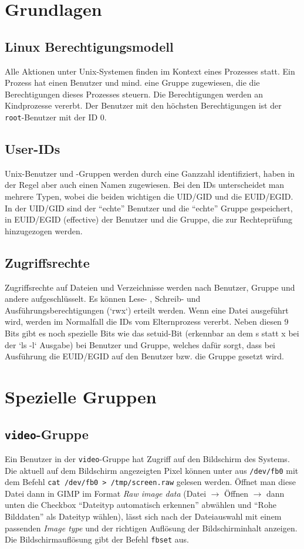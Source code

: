 \documentclass[
    parskip=half,
    landscape
]{scrartcl}
\begin{document}
\begin{multicols}{3}
\section{Grundlagen}
\subsection*{Linux Berechtigungsmodell}
Alle Aktionen unter Unix-Systemen finden im Kontext eines Prozesses statt.
Ein Prozess hat einen Benutzer und mind. eine Gruppe zugewiesen, die die Berechtigungen dieses Prozesses steuern.
Die Berechtigungen werden an Kindprozesse vererbt.
Der Benutzer mit den höchsten Berechtigungen ist der \texttt{root}-Benutzer mit der ID 0.

\subsection*{User-IDs}
Unix-Benutzer und -Gruppen werden durch eine Ganzzahl identifiziert, haben in der Regel aber auch einen Namen zugewiesen.
Bei den IDs unterscheidet man mehrere Typen, wobei die beiden wichtigen die UID/GID und die EUID/EGID.
In der UID/GID sind der \enquote{echte} Benutzer und die \enquote{echte} Gruppe gespeichert, in EUID/EGID (effective) der Benutzer und die Gruppe, die zur Rechteprüfung hinzugezogen werden.

\subsection*{Zugriffsrechte}
Zugriffsrechte auf Dateien und Verzeichnisse werden nach Benutzer, Gruppe und andere aufgeschlüsselt.
Es können Lese- , Schreib- und Ausführungsberechtigungen (`rwx`) erteilt werden.
Wenn eine Datei ausgeführt wird, werden im Normalfall die IDs vom Elternprozess vererbt.
Neben diesen 9 Bits gibt es noch spezielle Bits wie das setuid-Bit (erkennbar an dem s statt x bei der `ls -l` Ausgabe)  bei Benutzer und Gruppe, welches dafür sorgt, dass bei Ausführung die EUID/EGID auf den Benutzer bzw. die Gruppe gesetzt wird.

\section{Spezielle Gruppen}
\subsection*{\texttt{video}-Gruppe}
Ein Benutzer in der \texttt{video}-Gruppe hat Zugriff auf den Bildschirm des Systems.
Die aktuell auf dem Bildschirm angezeigten Pixel können unter aus \texttt{/dev/fb0} mit dem Befehl \texttt{cat /dev/fb0 > /tmp/screen.raw} gelesen werden.
Öffnet man diese Datei dann in GIMP im Format \emph{Raw image data} (Datei $\to$ Öffnen $\to$ dann unten die Checkbox \enquote{Dateityp automatisch erkennen} abwählen und \enquote{Rohe Bilddaten} als Dateityp wählen), lässt sich nach der Dateiauswahl mit einem passenden \emph{Image type} und der richtigen Auflösung der Bildschirminhalt anzeigen.
Die Bildschirmauflösung gibt der Befehl \texttt{fbset} aus.


\end{multicols}
\end{document}
